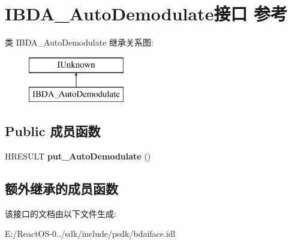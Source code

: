 \hypertarget{interface_i_b_d_a___auto_demodulate}{}\section{I\+B\+D\+A\+\_\+\+Auto\+Demodulate接口 参考}
\label{interface_i_b_d_a___auto_demodulate}
类 I\+B\+D\+A\+\_\+\+Auto\+Demodulate 继承关系图\+:\begin{figure}[H]
\begin{center}
\leavevmode
\includegraphics[height=2.000000cm]{interface_i_b_d_a___auto_demodulate}
\end{center}
\end{figure}
\subsection*{Public 成员函数}
\begin{DoxyCompactItemize}
\item 
\mbox{\label{interface_i_b_d_a___auto_demodulate_a607391ecda0c0b1a9c496172297284bb}} 
H\+R\+E\+S\+U\+LT {\bfseries put\+\_\+\+Auto\+Demodulate} ()
\end{DoxyCompactItemize}
\subsection*{额外继承的成员函数}


该接口的文档由以下文件生成\+:\begin{DoxyCompactItemize}
\item 
E\+:/\+React\+O\+S-\/0../sdk/include/psdk/bdaiface.\+idl\end{DoxyCompactItemize}
